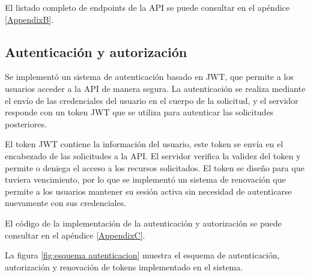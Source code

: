 
El listado completo de endpoints de la API se puede consultar en el apéndice
\ref{AppendixB}.

\subsection{Autenticación y autorización}

Se implementó un sistema de autenticación basado en JWT, que permite a los
usuarios acceder a la API de manera segura. La autenticación se realiza
mediante el envío de las credenciales del usuario en el cuerpo de la solicitud,
y el servidor responde con un token JWT que se utiliza para autenticar las
solicitudes posteriores.

El token JWT contiene la información del usuario, este token se envía en el
encabezado de las solicitudes a la API. El servidor verifica la validez del
token y permite o deniega el acceso a los recursos solicitados. El token se
diseño para que tuviera vencimiento, por lo que se implementó un sistema de
renovación que permite a los usuarios mantener su sesión activa sin necesidad
de autenticarse nuevamente con sus credenciales.

El código de la implementación de la autenticación y autorización se puede
consultar en el apéndice \ref{AppendixC}.

La figura \ref{fig:esquema autenticacion} muestra el esquema de autenticación,
autorización y renovación de tokens implementado en el sistema.

